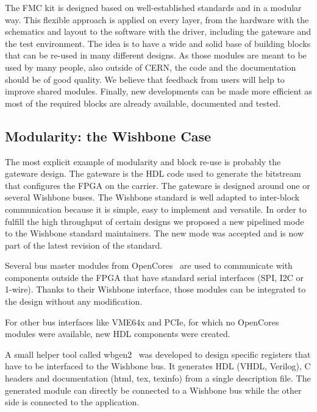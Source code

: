 \documentclass{JAC2003}
\begin{document}
The FMC kit is designed based on well-established standards and in a modular way.
This flexible approach is applied on every layer, from the hardware with the schematics and layout to the software with the driver, including the gateware and the test environment.
The idea is to have a wide and solid base of building blocks that can be re-used in many different designs.
As those modules are meant to be used by many people, also outside of CERN, the code and the documentation should be of good quality.
We believe that feedback from users will help to improve shared modules.
Finally, new developments can be made more efficient as most of the required blocks are already available, documented and tested.

\subsection{Modularity: the Wishbone Case}
The most explicit example of modularity and block re-use is probably the gateware design.
The gateware is the HDL code used to generate the bitstream that configures the FPGA on the carrier.
The gateware is designed around one or several Wishbone buses.
The Wishbone standard is well adapted to inter-block communication because it is simple, easy to implement and versatile.
In order to fulfill the high throughput of certain designs we proposed a new pipelined mode to the Wishbone standard maintainers. The new mode was accepted and is now part of the latest revision of the standard.

Several bus master modules from OpenCores~\cite{opencores} are used to communicate with components outside the FPGA that have standard serial interfaces (SPI, I2C or 1-wire).
Thanks to their Wishbone interface, those modules can be integrated to the design without any modification.

For other bus interfaces like VME64x and PCIe, for which no OpenCores modules were available, new HDL components were created.

A small helper tool called wbgen2~\cite{wbgen2} was developed to design specific registers that have to be interfaced to the Wishbone bus.
It generates HDL (VHDL, Verilog), C headers and documentation (html, tex, texinfo) from a single description file.
The generated module can directly be connected to a Wishbone bus while the other side is connected to the application.
\end{document}
